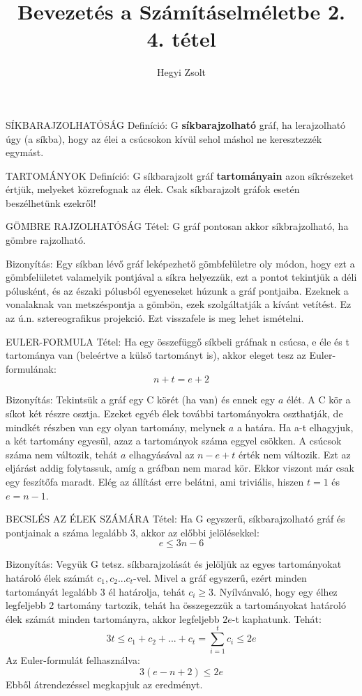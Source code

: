 \documentclass[]{article}
\title{Bevezetés a Számításelméletbe 2.\\{\large 4. tétel}}
\author{Hegyi Zsolt}
\begin{document}
\begin{shaded}
SÍKBARAJZOLHATÓSÁG Definíció: G \textbf{síkbarajzolható} gráf, ha lerajzolható úgy (a síkba), hogy az élei a csúcsokon kívül sehol máshol ne keresztezzék egymást.
\end{shaded}
\begin{shaded}
TARTOMÁNYOK Definíció: G síkbarajzolt gráf \textbf{tartományain} azon síkrészeket értjük, melyeket közrefognak az élek. Csak síkbarajzolt gráfok esetén beszélhetünk ezekről!
\end{shaded}
\begin{framed}
GÖMBRE RAJZOLHATÓSÁG Tétel: G gráf pontosan akkor síkbrajzolható, ha gömbre rajzolható.
\end{framed}
\begin{leftbar}
Bizonyítás: Egy síkban lévő gráf leképezhető gömbfelületre oly módon, hogy ezt a gömbfelületet valamelyik pontjával a síkra helyezzük, ezt a pontot tekintjük a déli pólusként, és az északi pólusból egyeneseket húzunk a gráf pontjaiba. Ezeknek a vonalaknak van metszéspontja a gömbön, ezek szolgáltatják a kívánt vetítést. Ez az ú.n. sztereografikus projekció. Ezt visszafele is meg lehet ismételni.
\end{leftbar}
\begin{framed}
EULER-FORMULA Tétel: Ha egy összefüggő síkbeli gráfnak n csúcsa, e éle és t tartománya van (beleértve a külső tartományt is), akkor eleget tesz az Euler-formulának:
$$n + t = e + 2$$
\end{framed}
\begin{leftbar}
Bizonyítás: Tekintsük a gráf egy C körét (ha van) és ennek egy $a$ élét. A C kör a síkot két részre osztja. Ezeket egyéb élek további tartományokra oszthatják, de mindkét részben van egy olyan tartomány, melynek $a$ a határa. Ha a-t elhagyjuk, a két tartomány egyesül, azaz a tartományok száma eggyel csökken. A csúcsok száma nem változik, tehát $a$ elhagyásával az $n - e + t$ érték nem változik. Ezt az eljárást addig folytassuk, amíg a gráfban nem marad kör. Ekkor viszont már csak egy feszítőfa maradt. Elég az állítást erre belátni, ami triviális, hiszen $t = 1$ és $e = n - 1$.
\end{leftbar}
\begin{framed}
BECSLÉS AZ ÉLEK SZÁMÁRA Tétel: Ha G egyszerű, síkbarajzolható gráf és pontjainak a száma legalább 3, akkor az előbbi jelölésekkel:
$$e \leq 3n - 6$$ 
\end{framed}
\begin{leftbar}
Bizonyítás: Vegyük G tetsz. síkbarajzolását és jelöljük az egyes tartományokat határoló élek számát $c_1, c_2...c_t$-vel. Mivel a gráf egyszerű, ezért minden tartományát legalább 3 él határolja, tehát $c_i \geq 3$. Nyílvánvaló, hogy egy élhez legfeljebb 2 tartomány tartozik, tehát ha összegezzük a tartományokat határoló élek számát minden tartományra, akkor legfeljebb $2e$-t kaphatunk. Tehát:
$$3t \leq c_1 + c_2 + ... + c_t = \sum_{i=1}^{t} c_i \leq 2e$$
Az Euler-formulát felhasználva:
$$3(e - n + 2) \leq 2e$$
Ebből átrendezéssel megkapjuk az eredményt.
\end{leftbar}
\end{document}
